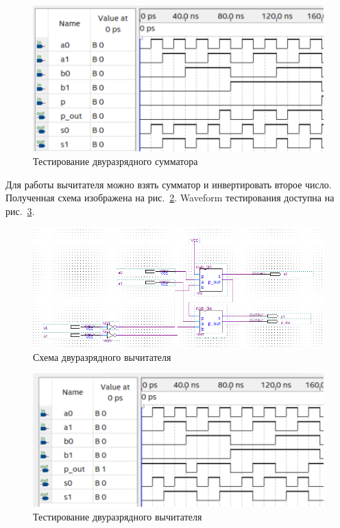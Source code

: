 \documentclass[a4paper,14pt]{article}
\begin{document}
\begin{figure}[H]
	\centering
	\includegraphics[width=0.8\linewidth]{image/wave_sum}
	\caption{Тестирование двуразрядного сумматора}
	\label{fig:wave_sum}
\end{figure}

Для работы вычитателя можно взять сумматор и инвертировать второе число.
Полученная схема изображена на рис.~\ref{fig:schema_sub}.
Waveform тестирования доступна на рис.~\ref{fig:wave_sub}.

\begin{figure}[H]
	\centering
	\includegraphics[width=\linewidth]{image/schema_sub}
	\caption{Схема двуразрядного вычитателя}
	\label{fig:schema_sub}
\end{figure}

\begin{figure}[H]
	\centering
	\includegraphics[width=0.8\linewidth]{image/wave_sub}
	\caption{Тестирование двуразрядного вычитателя}
	\label{fig:wave_sub}
\end{figure}
\end{document}
